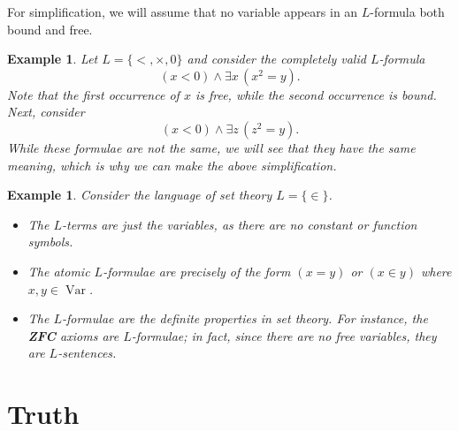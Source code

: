 \documentclass[10pt]{article}
\DeclareMathOperator{\Var}{Var}
\theoremstyle{newstyle}
\newtheorem{exmp}[thm]{Example}
\begin{document}
For simplification, we will assume that no variable appears in an $L$-formula both bound and free.

\begin{exmp}
Let $L = \{<, \times, 0\}$ and consider the completely valid $L$-formula 
\[ (x < 0) \wedge \exists x \, (x^2 = y). \] 
Note that the first occurrence of $x$ is free, while the second occurrence is bound. 
Next, consider 
\[ (x < 0) \wedge \exists z \, (z^2 = y). \] 
While these formulae are not the same, we will see that they have the same 
meaning, which is why we can make the above simplification. 
\end{exmp}

\begin{exmp}
Consider the language of set theory $L = \{\in\}$.
\begin{itemize}
    \item The $L$-terms are just the variables, as there are no constant or function symbols.
    \item The atomic $L$-formulae are precisely of the form $(x = y)$ or $(x \in y)$ 
    where $x, y \in \Var$. 
    \item The $L$-formulae are the definite properties in set theory. For instance, 
    the {\bf ZFC} axioms are $L$-formulae; in fact, since there are no free variables, 
    they are $L$-sentences.
\end{itemize}
\end{exmp}

\newpage 
\section{Truth}
\end{document}
